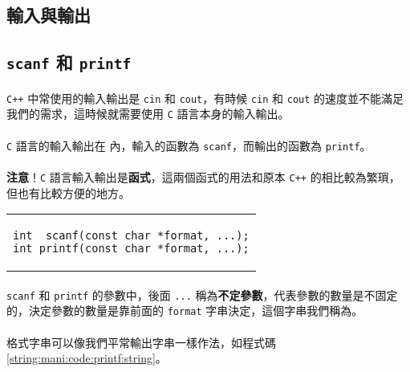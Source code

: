 \documentclass[12pt,a4paper,oneside]{report}
\begin{document}
\begin{CJK}{UTF8}{bkai}
\section{輸入與輸出}

\subsection{\lstinline!scanf! 和 \lstinline!printf!}

\paragraph{}\texttt{C++} 中常使用的輸入輸出是 \lstinline!cin! 和 \lstinline!cout!，有時候 \lstinline!cin! 和 \lstinline!cout! 的速度並不能滿足我們的需求，這時候就需要使用 \texttt{C} 語言本身的輸入輸出。
\paragraph{}\texttt{C} 語言的輸入輸出在  內，輸入的函數為 \lstinline!scanf!，而輸出的函數為 \lstinline!printf!。
\paragraph{}{\color{red}\textbf{注意}}！\texttt{C} 語言輸入輸出是\textbf{函式}，這兩個函式的用法和原本 \texttt{C++} 的相比較為繁瑣，但也有比較方便的地方。

\begin{code}[h!]
  \centering
  \begin{tabular}{c}
  \begin{lstlisting}
int  scanf(const char *format, ...);
int printf(const char *format, ...);
  \end{lstlisting}
  \end{tabular}
  \caption{\lstinline!scanf! 和 \lstinline!printf!}
  \label{string:mani:code:scanf:and:printf}
\end{code}

\paragraph{}\lstinline!scanf! 和 \lstinline!printf! 的參數中，後面 \lstinline!...! 稱為\textbf{不定參數}，代表參數的數量是不固定的，決定參數的數量是靠前面的 \lstinline!format! 字串決定，這個字串我們稱為。
\paragraph{}格式字串可以像我們平常輸出字串一樣作法，如程式碼 \ref{string:mani:code:printf:string}。


\end{CJK}
\end{document}
